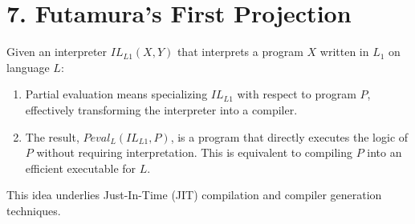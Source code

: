 \documentclass{article}
\begin{document}
\section*{7. Futamura’s First Projection}

Given an interpreter \( IL_{L1}(X, Y) \) that interprets a program \( X \) written in \( L_1 \) on language \( L \):

\begin{enumerate}
    \item Partial evaluation means specializing \( IL_{L1} \) with respect to program \( P \), effectively transforming the interpreter into a compiler.
    \item The result, \( Peval_L(IL_{L1}, P) \), is a program that directly executes the logic of \( P \) without requiring interpretation. This is equivalent to compiling \( P \) into an efficient executable for \( L \).
\end{enumerate}

This idea underlies Just-In-Time (JIT) compilation and compiler generation techniques.
\end{document}
